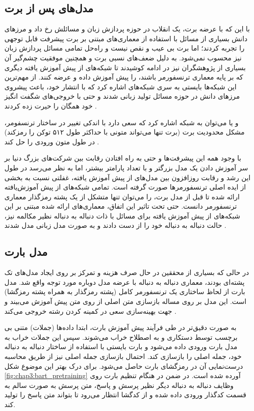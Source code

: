 \subsection{مدل‌های پس از برت}
با این که با عرضه برت، یک انقلاب در حوزه پردازش زبان و مسائلش رخ داد و مرز‌های دانش بسیاری از مسائل با استفاده از معماری‌های مبتنی بر برت پیشرفت قابل توجهی را تجربه کردند؛ اما برت بی عیب و نقص نیست و راه‌حل تمامی مسائل پردازش زبان نیز محسوب نمی‌شود. به دلیل ضعف‌های نسبی برت و همچنین موفقیت چشم‌گیر آن بسیاری از پژوهشگران نیز در ادامه کوشیدند تا شبکه‌های از پیش آموزش یافته دیگری که بر پایه معماری ترنسفورمر باشند، را پیش آموزش داده و عرضه کنند.
از مهم‌ترین این شبکه‌ها بایستی به سری شبکه‌های 
اشاره کرد که با انتشار خود، باعث پیشروی مرز‌های دانش در حوزه مسائل تولید زبانی شدند و حتی با خروجی‌های شگفت انگیز خود همگان را حیرت زده کردند
\cite{gpt2_paper, gpt3_paper}.

و یا می‌توان به شبکه
اشاره کرد که سعی دارد با اندکی تغییر در ساختار ترنسفومر، مشکل محدودیت برت 
(برت تنها می‌تواند متونی با حداکثر طول ۵۱۲ توکن را رمزکند)
در طول متون ورودی را حل کند
\cite{DBLP:journals/corr/abs-1901-02860}.

با وجود همه این پیشرفت‌ها و حتی به راه افتادن رقابت بین شرکت‌های بزرگ دنیا بر سر آموزش دادن یک مدل بزرگتر و با تعداد پارامتر بیشتر، اما به نظر می‌رسد در طول این رشد و رقابت روزافزون بین مدل‌های از پیش آموزش یافته، غفلتی نسبت به بخشی از ایده اصلی ترنسفورمر‌ها صورت گرفته است. تمامی شبکه‌های از پیش آموز‌ش‌یافته ارائه شده تا قبل از مدل برت، را می‌توان تنها متشکل از یک پشته رمزگذار معماری ترنسفورمر دانست. حتی تحت تاثیر این اتفاق، معماری‌های ارائه شده مبتنی بر این شبکه‌های از پیش آموزش یافته برای مسائل با ذات دنباله به دنباله نظیر مکالمه نیز، حالت دنباله به دنباله خود را از دست دادند و به صورت مدل زبانی مدل شدند
\cite{zhang2019dialogpt}.


\subsection{مدل بارت}
در حالی که بسیاری از محققین در حال صرف هزینه و تمرکز بر روی ایجاد مدل‌های تک پشته‌ای بودند، معماری دنباله به دنباله با عرضه مدل 
دوباره مورد توجه واقع شد. مدل بارت از لحاظ ساختاری یک ترنسفورمر کامل (پشته رمزگذار به همراه پشته رمزگشا) است. این مدل بر روی مساله بازسازی متن اصلی از روی متن 
پیش آموزش می‌بیند و جهت بهینه‌سازی سعی در کمینه‌ کردن 
رشته خروجی می‌کند
\cite{lewis2019bart}.
 
 به صورت دقیق‌تر در طی فرآیند پیش‌‌‌ آموزش بارت، ابتدا داده‌‌ها (جملات) متنی بی برچسب توسط 
دستکاری و به اصطلاح خراب می‌شوند. سپس این جملات خراب به مدل بارت ورودی داده می‌شود و بارت بایستی با استفاده از ساختار دنباله به دنباله خود، جمله اصلی را بازسازی کند. احتمال بازسازی جمله اصلی نیز از طریق محاسبه درست‌نمایی آن در رمزگشای بارت حاصل می‌شود. برای درک بهتر این موضوع شکل
\ref{fig:chap3:bart_pretraining}
آورده شده است. در ضمن در هنگام تنظیم بارت روی وظایف دنباله به دنباله دیگر نظیر پرسش و پاسخ، متن پرسش به صورت سالم به قسمت کدگذار ورودی داده شده و از کدگشا انتظار می‌رود تا بتواند متن پاسخ را تولید کند.

